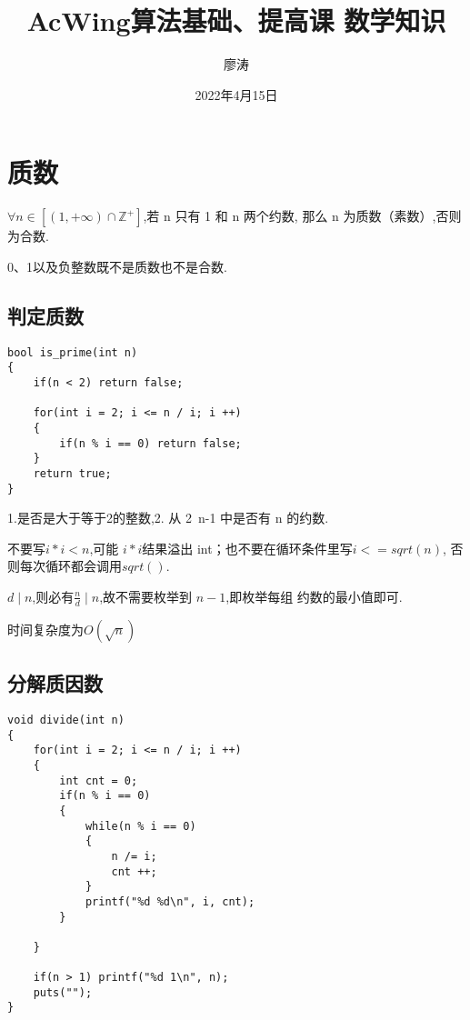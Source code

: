 \documentclass[]{book}
\title{AcWing算法基础、提高课 数学知识}
\author{廖涛}
\date{2022年4月15日}
\begin{document}


\maketitle
\tableofcontents

\chapter{质数}
$\forall n\in [(1, +\infty) \cap \mathbb{Z}^+]$,若 n 只有 1 和 n 两个约数,
那么 n 为质数（素数）,否则为合数.

0、1以及负整数既不是质数也不是合数.

\section{判定质数}
\begin{lstlisting}
bool is_prime(int n)
{
    if(n < 2) return false;

    for(int i = 2; i <= n / i; i ++)
    {
        if(n % i == 0) return false;
    }
    return true;
}
\end{lstlisting}

1.是否是大于等于2的整数,2. 从 2~n-1 中是否有 n 的约数.

不要写$i*i<n$,可能 $i*i$结果溢出 int；也不要在循环条件里写$i<=sqrt(n)$,
否则每次循环都会调用$sqrt()$.

$d \mid n$,则必有$\frac{n}{d} \mid n$,故不需要枚举到 $n - 1$,即枚举每组
约数的最小值即可.

时间复杂度为$O(\sqrt{n})$

\section{分解质因数}
\begin{lstlisting}
void divide(int n)
{
    for(int i = 2; i <= n / i; i ++)
    {   
        int cnt = 0;
        if(n % i == 0)
        {
            while(n % i == 0)
            {
                n /= i;
                cnt ++;
            }
            printf("%d %d\n", i, cnt);
        }
        
    }
    
    if(n > 1) printf("%d 1\n", n);
    puts("");
}
\end{lstlisting}
\end{document}
